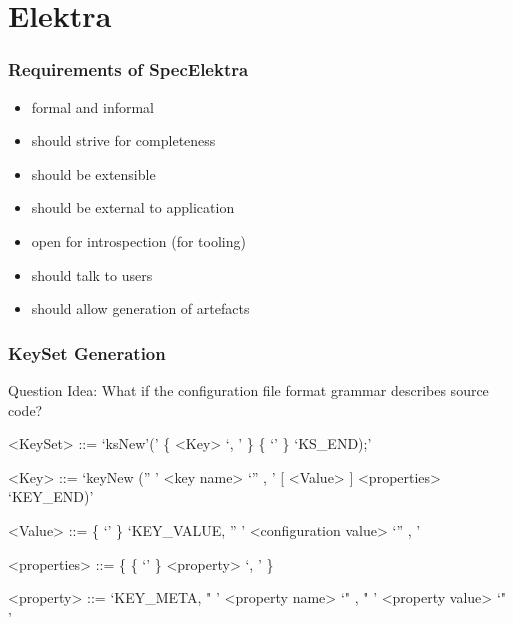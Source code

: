 \section{Elektra}

\begin{frame}
	\frametitle{Requirements of SpecElektra}

	\pause
	\begin{itemize}
	\item formal and informal
	\item should strive for completeness
	\item should be extensible
	\item should be external to application
	\item open for introspection (for tooling)
	\item should talk to users
	\item should allow generation of artefacts
	\end{itemize}
\end{frame}




\begin{frame}[fragile]
	\frametitle{KeySet Generation}
	\begin{alertblock}{Question}
	Idea: What if the configuration file format grammar describes source code?
	\end{alertblock}
	\pause

	\begin{grammar}
	<KeySet> ::= \lq ksNew'\WhiteSpace(' \{ <Key> \lq , \LineBreak'  \}  \{ \lq\WhiteSpace' \} \lq KS\_END);'

	<Key> ::= \lq keyNew \WhiteSpace ('' ' <key name> \lq ''  , \LineBreak' [ <Value> ] <properties> \lq KEY_END)'

	<Value> ::=  \{ \lq\WhiteSpace' \} \lq KEY\_VALUE, \WhiteSpace '' ' <configuration value> \lq ''  , \LineBreak'

	<properties> ::= \{ \{ \lq\WhiteSpace' \} <property> \lq , \LineBreak' \}

	<property> ::=  \lq KEY\_META, \WhiteSpace " ' <property name> \lq "  , \WhiteSpace " ' <property value> \lq " '
	\end{grammar}
\end{frame}

